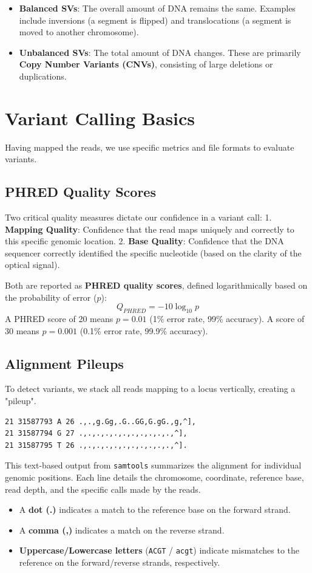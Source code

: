 \begin{itemize}
  \item \textbf{Balanced SVs}: The overall amount of DNA remains the same. Examples include inversions (a segment is flipped) and translocations (a segment is moved to another chromosome).
  \item \textbf{Unbalanced SVs}: The total amount of DNA changes. These are primarily \textbf{Copy Number Variants (CNVs)}, consisting of large deletions or duplications.
\end{itemize}

\section{Variant Calling Basics}

Having mapped the reads, we use specific metrics and file formats to evaluate variants.

\subsection{PHRED Quality Scores}

Two critical quality measures dictate our confidence in a variant call:
1. \textbf{Mapping Quality}: Confidence that the read maps uniquely and correctly to this specific genomic location.
2. \textbf{Base Quality}: Confidence that the DNA sequencer correctly identified the specific nucleotide (based on the clarity of the optical signal).

Both are reported as \textbf{PHRED quality scores}, defined logarithmically based on the probability of error (\( p \)):
\[
Q_{PHRED} = -10 \log_{10} p
\]
\sta A PHRED score of 20 means $p = 0.01$ (1\% error rate, 99\% accuracy). A score of 30 means $p = 0.001$ (0.1\% error rate, 99.9\% accuracy).

\subsection{Alignment Pileups}

To detect variants, we stack all reads mapping to a locus vertically, creating a "pileup".

\begin{verbatim}
21 31587793 A 26 .,.,g.Gg,.G..GG,G.gG.,g,^],
21 31587794 G 27 .,.,.,.,.,.,.,.,.,.,.,^],
21 31587795 T 26 .,.,.,.,.,.,.,.,.,.,.,^].
\end{verbatim}

This text-based output from \texttt{samtools} summarizes the alignment for individual genomic positions. Each line details the chromosome, coordinate, reference base, read depth, and the specific calls made by the reads.
\begin{itemize}
  \item A \textbf{dot (.)} indicates a match to the reference base on the forward strand.
  \item A \textbf{comma (,)} indicates a match on the reverse strand.
  \item \textbf{Uppercase/Lowercase letters} (\texttt{ACGT} / \texttt{acgt}) indicate mismatches to the reference on the forward/reverse strands, respectively.
\end{itemize}

